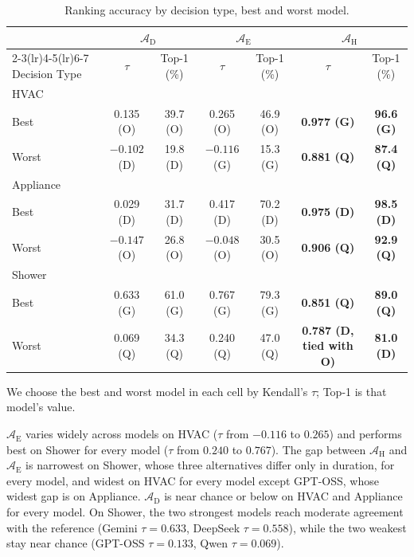 \documentclass[final,3p,times]{elsarticle}
\begin{document}
\begin{table}[htbp]
\caption{Ranking accuracy by decision type, best and worst model.}
\label{tab:item7}
\centering
\begin{threeparttable}
\centering
\footnotesize
\renewcommand{\arraystretch}{1.15}
\setlength{\tabcolsep}{4pt}
\begin{tabular}{lcccccc}
\toprule
 & \multicolumn{2}{c}{$\mathcal{A}_{\text{D}}$} & \multicolumn{2}{c}{$\mathcal{A}_{\text{E}}$} & \multicolumn{2}{c}{$\mathcal{A}_{\text{H}}$} \\
\cmidrule(lr){2-3}\cmidrule(lr){4-5}\cmidrule(lr){6-7}
Decision Type & $\tau$ & Top-1 (\%) & $\tau$ & Top-1 (\%) & $\tau$ & Top-1 (\%) \\
\midrule
HVAC & & & & & & \\
\quad Best & 0.135 (O) & 39.7 (O) & 0.265 (O) & 46.9 (O) & \textbf{0.977 (G)} & \textbf{96.6 (G)} \\
\quad Worst & $-0.102$ (D) & 19.8 (D) & $-0.116$ (G) & 15.3 (G) & \textbf{0.881 (Q)} & \textbf{87.4 (Q)} \\
Appliance & & & & & & \\
\quad Best & 0.029 (D) & 31.7 (D) & 0.417 (D) & 70.2 (D) & \textbf{0.975 (D)} & \textbf{98.5 (D)} \\
\quad Worst & $-0.147$ (O) & 26.8 (O) & $-0.048$ (O) & 30.5 (O) & \textbf{0.906 (Q)} & \textbf{92.9 (Q)} \\
Shower & & & & & & \\
\quad Best & 0.633 (G) & 61.0 (G) & 0.767 (G) & 79.3 (G) & \textbf{0.851 (Q)} & \textbf{89.0 (Q)} \\
\quad Worst & 0.069 (Q) & 34.3 (Q) & 0.240 (Q) & 47.0 (Q) & \textbf{0.787 (D, tied with O)} & \textbf{81.0 (D)} \\
\bottomrule
\end{tabular}
\begin{tablenotes}
\footnotesize
\item We choose the best and worst model in each cell by Kendall's $\tau$; Top-1 is that model's value.
\end{tablenotes}
\setlength{\tabcolsep}{6pt}
\renewcommand{\arraystretch}{1.0}
\end{threeparttable}
\end{table}

$\mathcal{A}_{\text{E}}$ varies widely across models on HVAC ($\tau$ from $-0.116$ to $0.265$) and performs best on Shower for every model ($\tau$ from $0.240$ to $0.767$). The gap between $\mathcal{A}_{\text{H}}$ and $\mathcal{A}_{\text{E}}$ is narrowest on Shower, whose three alternatives differ only in duration, for every model, and widest on HVAC for every model except GPT-OSS, whose widest gap is on Appliance. $\mathcal{A}_{\text{D}}$ is near chance or below on HVAC and Appliance for every model. On Shower, the two strongest models reach moderate agreement with the reference (Gemini $\tau = 0.633$, DeepSeek $\tau = 0.558$), while the two weakest stay near chance (GPT-OSS $\tau = 0.133$, Qwen $\tau = 0.069$).
\end{document}
